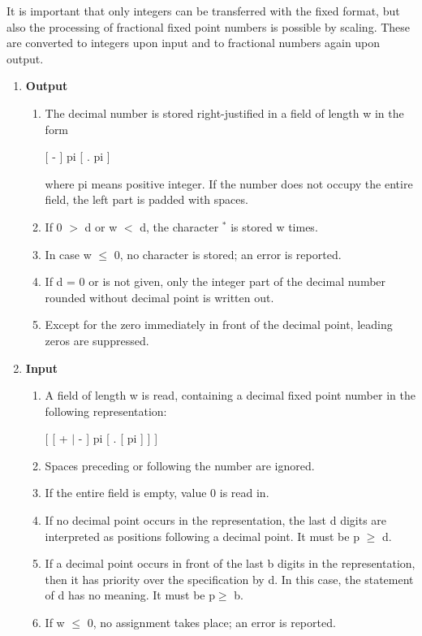 It is important that only integers can be transferred with the fixed
format, but also the processing of fractional fixed point numbers is
possible by scaling. These are converted to integers upon input and to
fractional numbers again upon output.

\begin{removed}
\begin{enumerate}
\item {\bf Output}
\begin{enumerate}
\item The decimal number is stored right-justified in a field of length
w in the form

[ - ] pi [ . pi ]

where pi means positive integer. If the number does not occupy the
entire field, the left part is padded with spaces.
\item If 0 $>$ d or w $<$ d, the character $^*$ is stored w times.
\item In case w $\leq$ 0, no character is stored; an error is reported.
\item If d = 0 or is not given, only the integer part of the decimal
number rounded without decimal point is written out.
\item Except for the zero immediately in front of the decimal point,
leading zeros are suppressed.
\end{enumerate}
\item {\bf Input}
\begin{enumerate}
\item A field of length w is read, containing a decimal fixed point
number in the following representation:

[ [ + $\mid$ - ] pi [ . [ pi ] ] ]

\item Spaces preceding or following the number are ignored.
\item If the entire field is empty, value 0 is read in.
\item If no decimal point occurs in the representation, the last d
digits are interpreted as positions following a decimal point. It must
be p $\geq$ d.
\item If a decimal point occurs in front of the last b digits in the
representation, then it has priority over the specification by d. In
this case, the statement of d has no meaning. It must be p$\geq$ b.
\item If w $\leq$ 0, no assignment takes place; an error is reported.
\end{enumerate}
\end{enumerate}


\end{removed}
